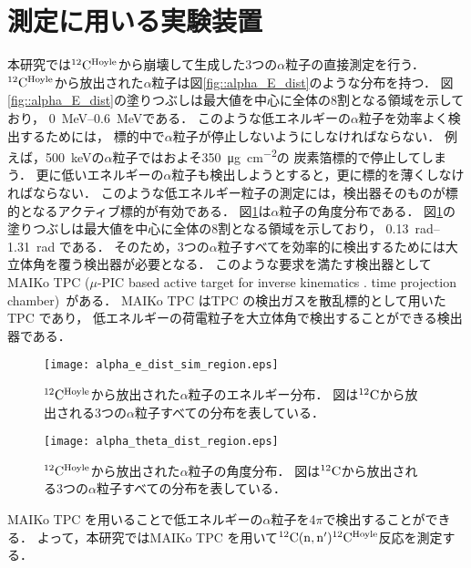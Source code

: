 \documentclass[../master]{subfiles}
\begin{document}
\section{測定に用いる実験装置}
\label{seq::detector_using_experiment}
本研究では${}^{12}{\rm C}^{\rm Hoyle}$から崩壊して生成した3つの$\alpha$粒子の直接測定を行う．
${}^{12}{\rm C}^{\rm Hoyle}$から放出された$\alpha$粒子は図\ref{fig::alpha_E_dist}のような分布を持つ．
図\ref{fig::alpha_E_dist}の塗りつぶしは最大値を中心に全体の8割となる領域を示しており，
\SIrange{0}{0.6}{\mega\electronvolt}である．
このような低エネルギーの$\alpha$粒子を効率よく検出するためには，
標的中で$\alpha$粒子が停止しないようにしなければならない．
例えば，\SI{500}{\kilo\electronvolt}の$\alpha$粒子ではおよそ\SI{350}{\micro\gram\per\square\centi\metre}の
炭素箔標的で停止してしまう．
更に低いエネルギーの$\alpha$粒子も検出しようとすると，更に標的を薄くしなければならない．
このような低エネルギー粒子の測定には，検出器そのものが標的となるアクティブ標的が有効である．
図\ref{fig::alpha_theta_dist}は$\alpha$粒子の角度分布である．
図\ref{fig::alpha_theta_dist}の塗りつぶしは最大値を中心に全体の8割となる領域を示しており，
\SIrange{0.13}{1.31}{\radian} である．
そのため，3つの$\alpha$粒子すべてを効率的に検出するためには大立体角を覆う検出器が必要となる．
このような要求を満たす検出器としてMAIKo TPC ($\mu$-PIC based active target for inverse kinematics .
time projection chamber)~\cite{maiko, mupic}がある．
MAIKo TPC はTPC の検出ガスを散乱標的として用いたTPC であり，
低エネルギーの荷電粒子を大立体角で検出することができる検出器である．
\begin{figure}
  \centering
  \texttt{[image: alpha\_e\_dist\_sim\_region.eps]}
  \caption[${}^{12}{\rm C}^{\rm Hoyle}$から放出された$\alpha$粒子のエネルギー分布．]
          {${}^{12}{\rm C}^{\rm Hoyle}$から放出された$\alpha$粒子のエネルギー分布．
            図は${}^{12}{\rm C}$から放出される3つの$\alpha$粒子すべての分布を表している．}
  \label{fig::alpha_E_dist}
  \texttt{[image: alpha\_theta\_dist\_region.eps]}
  \caption[${}^{12}{\rm C}^{\rm Hoyle}$から放出された$\alpha$粒子の角度分布．]
          {${}^{12}{\rm C}^{\rm Hoyle}$から放出された$\alpha$粒子の角度分布．
            図は${}^{12}{\rm C}$から放出される3つの$\alpha$粒子すべての分布を表している．
          }
  \label{fig::alpha_theta_dist}
\end{figure}
MAIKo TPC を用いることで低エネルギーの$\alpha$粒子を4$\pi$で検出することができる．
よって，本研究ではMAIKo TPC を用いて${}^{12}{\rm C}({\rm n},{\rm n}'){}^{12}{\rm C}^{\rm Hoyle}$反応を測定する．
\end{document}
